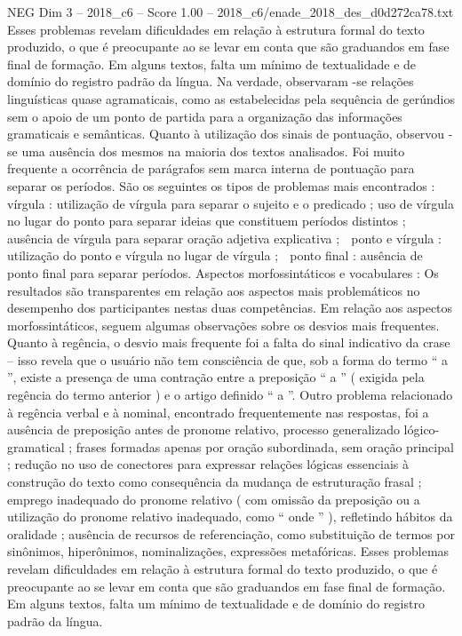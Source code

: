 \begin{textsample}{NEG Dim 3 – 2018\_c6 – Score 1.00 – 2018\_c6/enade\_2018\_des\_d0d272ca78.txt}
Esses problemas revelam dificuldades em relação à estrutura formal do texto produzido, o que é preocupante ao se levar em conta que são graduandos em fase final de formação.
Em alguns textos, falta um mínimo de textualidade e de domínio do registro padrão da língua.
Na verdade, observaram -se relações linguísticas quase agramaticais, como as estabelecidas pela sequência de gerúndios sem o apoio de um ponto de partida para a organização das informações gramaticais e semânticas.
Quanto à utilização dos sinais de pontuação, observou -se uma ausência dos mesmos na maioria dos textos analisados.
Foi muito frequente a ocorrência de parágrafos sem marca interna de pontuação para separar os períodos.
São os seguintes os tipos de problemas mais encontrados :  vírgula : utilização de vírgula para separar o sujeito e o predicado ; uso de vírgula no lugar do ponto para separar ideias que constituem períodos distintos ; ausência de vírgula para separar oração adjetiva explicativa ;  ponto e vírgula : utilização do ponto e vírgula no lugar de vírgula ;  ponto final : ausência de ponto final para separar períodos.
Aspectos morfossintáticos e vocabulares : Os resultados são transparentes em relação aos aspectos mais problemáticos no desempenho dos participantes nestas duas competências.
Em relação aos aspectos morfossintáticos, seguem algumas observações sobre os desvios mais frequentes.
Quanto à regência, o desvio mais frequente foi a falta do sinal indicativo da crase – isso revela que o usuário não tem consciência de que, sob a forma do termo “ a ”, existe a presença de uma contração entre a preposição “ a ” ( exigida pela regência do termo anterior ) e o artigo definido “ a ”.
Outro problema relacionado à regência verbal e à nominal, encontrado frequentemente nas respostas, foi a ausência de preposição antes de pronome relativo, processo generalizado lógico-gramatical ; frases formadas apenas por oração subordinada, sem oração principal ; redução no uso de conectores para expressar relações lógicas essenciais à construção do texto como consequência da mudança de estruturação frasal ; emprego inadequado do pronome relativo ( com omissão da preposição ou a utilização do pronome relativo inadequado, como “ onde ” ), refletindo hábitos da oralidade ; ausência de recursos de referenciação, como substituição de termos por sinônimos, hiperônimos, nominalizações, expressões metafóricas.
Esses problemas revelam dificuldades em relação à estrutura formal do texto produzido, o que é preocupante ao se levar em conta que são graduandos em fase final de formação.
Em alguns textos, falta um mínimo de textualidade e de domínio do registro padrão da língua.

\end{textsample}
